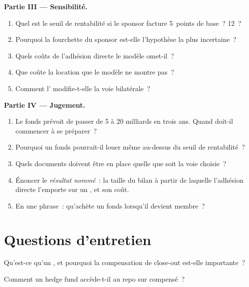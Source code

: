 \begin{problem}
\medskip\noindent\textbf{Partie III --- Sensibilité.}
\begin{enumerate}[resume]
\item Quel est le seuil de rentabilité si le sponsor facture 5~points de base~? 12~?
\item Pourquoi la fourchette du sponsor est-elle l'hypothèse la plus incertaine~?
\item Quels coûts de l'adhésion directe le modèle omet-il~?
\item Que coûte la location que le modèle ne montre pas~?
\item Comment l' modifie-t-elle la voie bilatérale~?
\end{enumerate}

\medskip\noindent\textbf{Partie IV --- Jugement.}
\begin{enumerate}[resume]
\item Le fonds prévoit de passer de 5 à 20 milliards en trois ans. Quand doit-il
commencer à se préparer~?
\item Pourquoi un fonds pourrait-il louer même au-dessus du seuil de rentabilité~?
\item Quels documents doivent être en place quelle que soit la voie choisie~?
\item Énoncer le \emph{résultat nommé}~: la taille du bilan à partir de laquelle l'adhésion directe
l'emporte sur un , et son coût.
\item En une phrase~: qu'achète un fonds lorsqu'il devient membre~?
\end{enumerate}
\end{problem}

\section{Questions d'entretien}

\begin{interviewq}\label{iq:m2:getting-access-rates-credit:1}
Qu'est-ce qu'un , et pourquoi la compensation de close-out est-elle importante~?
\end{interviewq}

\begin{interviewq}\label{iq:m2:getting-access-rates-credit:2}
Comment un hedge fund accède-t-il au repo sur  compensé~?
\end{interviewq}

